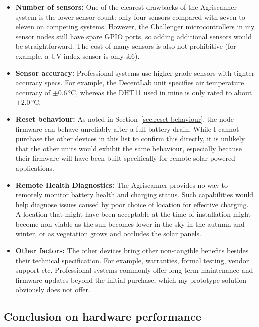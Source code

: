 \begin{itemize}
  \item \textbf{Number of sensors:} One of the clearest drawbacks of the
        Agriscanner system is the lower sensor count: only four sensors compared
        with seven to eleven on competing systems. However, the Challenger
        microcontrollers in my sensor nodes still have spare GPIO ports, so
        adding additional sensors would be straightforward. The cost of many
        sensors is also not prohibitive (for example, a UV index sensor is only
        \pounds{}6).
  \item \textbf{Sensor accuracy:} Professional systems use higher-grade sensors
        with tighter accuracy specs. For example, the DecentLab unit specifies
        air temperature accuracy of $\pm0.6\,\si{\celsius}$, whereas the DHT11
        used in mine is only rated to about $\pm2.0\,\si{\celsius}$.
  \item \textbf{Reset behaviour:} As noted in Section~\ref{sec:reset-behaviour},
        the node firmware can behave unreliably after a full battery drain.
        While I cannot purchase the other devices in this list to confirm this
        directly, it is unlikely that the other units would exhibit the same
        behaviour, especially because their firmware will have been built
        specifically for remote solar powered applications.
  \item \textbf{Remote Health Diagnostics:} The Agriscanner provides no way to
        remotely monitor battery health and charging status. Such capabilities
        would help diagnose issues caused by poor choice of location for
        effective charging. A location that might have been acceptable at the
        time of installation might become non-viable as the sun becomes lower in
        the sky in the autumn and winter, or as vegetation grows and occludes
        the solar panels.
  \item \textbf{Other factors:} The other devices bring other non-tangible
        benefits besides their technical specification. For example, warranties,
        formal testing, vendor support etc. Professional systems commonly offer
        long-term maintenance and firmware updates beyond the initial purchase,
        which my prototype solution obviously does not offer.
\end{itemize}

\subsection{Conclusion on hardware performance}

